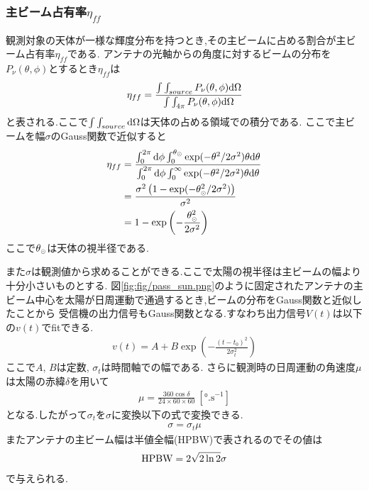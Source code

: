\subsubsection{主ビーム占有率$\eta_{ff}$}
\label{subsubsec:eta_ff}
観測対象の天体が一様な輝度分布を持つとき,その主ビームに占める割合が主ビーム占有率$\eta_{ff}$である.
アンテナの光軸からの角度に対するビームの分布を$P_\nu(\theta,\phi)$とするとき$\eta_{ff}$は
\begin{align}
  \eta_{ff}=\frac{\int\int_{source}P_\nu(\theta,\phi){\rm d}\Omega}{\int\int_{4\pi}P_\nu(\theta,\phi){\rm d}\Omega}
\end{align}
と表される.ここで$\int\int_{source}{\rm d}\Omega$は天体の占める領域での積分である.
ここで主ビームを幅$\sigma$のGauss関数で近似すると
\begin{align}
  \label{equ:eta_ff}
  \eta_{ff}&=\frac{\int_0^{2\pi}{\rm d}\phi\int_0^{\theta_{\tiny\astrosun}} \exp(-\theta^2/2\sigma^2)\theta{\rm d}\theta}{\int_0^{2\pi}{\rm d}\phi\int_0^{\infty} \exp(-\theta^2/2\sigma^2)\theta{\rm d}\theta}\nonumber\\
  &=\frac{\sigma^2\left(1-\exp(-\theta_{\tiny\astrosun}^2/2\sigma^2)\right)}{\sigma^2}\nonumber\\
  &=1-\exp\left(-\frac{\theta_{\tiny\astrosun}^2}{2\sigma^2}\right)
\end{align}
ここで$\theta_{\tiny\astrosun}$は天体の視半径である.

また$\sigma$は観測値から求めることができる.ここで太陽の視半径は主ビームの幅より十分小さいものとする.
図\ref{fig:fig/pass_sun.png}のように固定されたアンテナの主ビーム中心を太陽が日周運動で通過するとき,ビームの分布をGauss関数と近似したことから
受信機の出力信号もGauss関数となる.すなわち出力信号$V(t)$は以下の$v(t)$でfitできる.
\begin{align}
  \label{equ:v(t)}
  v(t)=A+B\exp\left(-\frac{(t-t_0)^2}{2\sigma_t^2}\right)
\end{align}
ここで$A$, $B$は定数, $\sigma_t$は時間軸での幅である.
さらに観測時の日周運動の角速度$\mu$は太陽の赤緯$\delta$を用いて
\begin{align}
  \label{equ:mu}
  \mu=\frac{360\cos\delta}{24\times60\times60}\ [\si{\degree.\second^{-1}}]
\end{align}
となる.したがって$\sigma_t$を$\sigma$に変換以下の式で変換できる.
\begin{align}
  \sigma=\sigma_t\mu
\end{align}
またアンテナの主ビーム幅は半値全幅(HPBW)で表されるのでその値は
\begin{align}
  \label{equ:HPBW}
  {\rm HPBW}=2\sqrt{2\ln2}\sigma
\end{align}
で与えられる.
